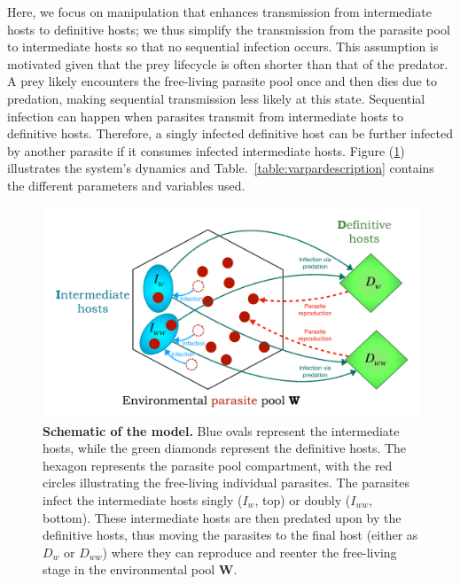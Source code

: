 \documentclass[a4paper]{scrartcl}
\begin{document}
Here, we focus on manipulation that enhances transmission from intermediate hosts to definitive hosts; we thus simplify the transmission from the parasite pool to intermediate hosts so that no sequential infection occurs. 
This assumption is motivated given that the prey lifecycle is often shorter than that of the predator. 
A prey likely encounters the free-living parasite pool once and then dies due to predation, making sequential transmission less likely at this state.
Sequential infection can happen when parasites transmit from intermediate hosts to definitive hosts. 
Therefore, a singly infected definitive host can be further infected by another parasite if it consumes infected intermediate hosts. 
Figure (\ref{fig:schematic}) illustrates the system's dynamics and Table.~\ref{table:varpardescription} contains the different parameters and variables used.
%
\begin{figure}[ht!]
\captionsetup{format=plain}
\centering
\includegraphics[width=\textwidth]{Figures/schematic.pdf}
\caption{\textbf{Schematic of the model.} 
Blue ovals represent the intermediate hosts, while the green diamonds represent the definitive hosts.
The hexagon represents the parasite pool compartment, with the red circles illustrating the free-living individual parasites.
The parasites infect the intermediate hosts singly ($I_w$, top) or doubly ($I_{ww}$, bottom).
These intermediate hosts are then predated upon by the definitive hosts, thus moving the parasites to the final host (either as $D_w$ or $D_{ww}$) where they can reproduce and reenter the free-living stage in the environmental pool $\mathbf{W}$.
}
\label{fig:schematic}
\end{figure}
\end{document}
